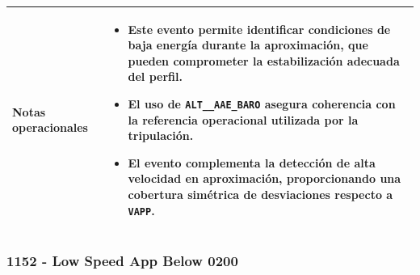 \documentclass[11pt,a4paper]{article}
\begin{document}
\begin{longtable}{p{5cm} p{9.5cm}}
		\textbf{Notas operacionales} &
		\begin{itemize}
			\item Este evento permite identificar condiciones de baja energía durante la aproximación, que pueden comprometer la estabilización adecuada del perfil.
			\item El uso de \texttt{ALT\_\_AAE\_BARO} asegura coherencia con la referencia operacional utilizada por la tripulación.
			\item El evento complementa la detección de alta velocidad en aproximación, proporcionando una cobertura simétrica de desviaciones respecto a \texttt{VAPP}.
		\end{itemize} \\
		\hline
		
	\end{longtable}
	
	\subsubsection{1152 - Low Speed App Below 0200}
	
\end{document}
